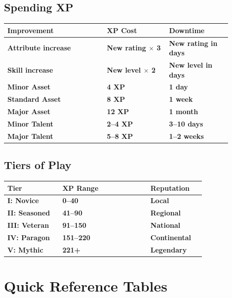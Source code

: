 \documentclass[10pt,twocolumn]{article} %
\begin{document}
\subsection{Spending XP}
\begin{coretable}[XP Costs]
\begin{tabular}{>{\bfseries}p{0.4\linewidth} >{\bfseries}p{0.25\linewidth} >{\bfseries}p{0.25\linewidth}}
\toprule
\textbf{Improvement} & \textbf{XP Cost} & \textbf{Downtime} \\
\midrule
Attribute increase & New rating $\times$ 3 & New rating in days \\
Skill increase & New level $\times$ 2 & New level in days \\
Minor Asset & 4 XP & 1 day \\
Standard Asset & 8 XP & 1 week \\
Major Asset & 12 XP & 1 month \\
Minor Talent & 2–4 XP & 3–10 days \\
Major Talent & 5–8 XP & 1–2 weeks \\
\bottomrule
\end{tabular}
\end{coretable}

\subsection{Tiers of Play}
\begin{coretable}
\begin{tabular}{>{\bfseries}p{0.25\linewidth} >{\bfseries}p{0.4\linewidth} >{\bfseries}p{0.25\linewidth}}
\toprule
\textbf{Tier} & \textbf{XP Range} & \textbf{Reputation} \\
\midrule
I: Novice & 0–40 & Local \\
II: Seasoned & 41–90 & Regional \\
III: Veteran & 91–150 & National \\
IV: Paragon & 151–220 & Continental \\
V: Mythic & 221+ & Legendary \\
\bottomrule
\end{tabular}
\end{coretable}

\section{Quick Reference Tables}
\end{document}
